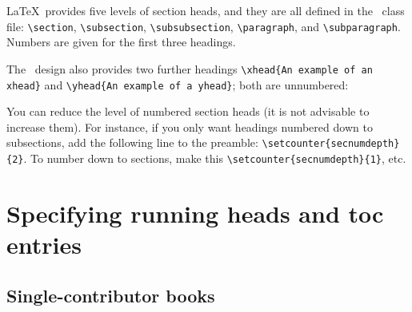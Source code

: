 \LaTeX\ provides five levels of section heads, and they are all defined in the \cambridge\ class file: \verb"\section", \verb"\subsection", \verb"\subsubsection", \verb"\paragraph", and \verb"\subparagraph". Numbers are given for the first three headings.

The \cambridge\ design also provides two further headings \verb"\xhead{An example of an xhead}" and \verb"\yhead{An example of a yhead}"; both are unnumbered:

You can reduce the level of numbered section heads (it is not advisable to increase them). For instance, if you only want headings numbered down to subsections, add the following line to the preamble: \verb"\setcounter{secnumdepth}{2}". To number down to sections, make this \verb"\setcounter{secnumdepth}{1}", etc.


\section{Specifying running heads and toc entries}

\subsection{Single-contributor books}
\label{singlecontributor}

